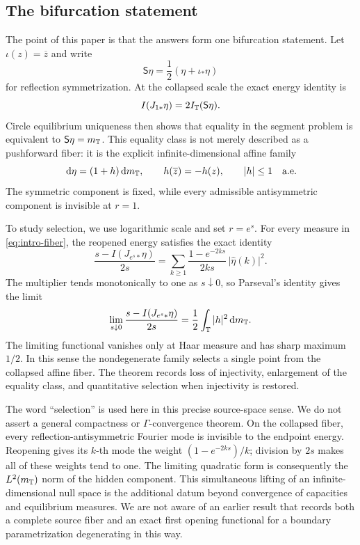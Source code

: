 \subsection*{The bifurcation statement}

The point of this paper is that the answers form one bifurcation
statement.  Let \(\iota(z)=\overline z\) and write
\[
 \mathsf S\eta=\frac12(\eta+\iota_\ast\eta)
\]
for reflection symmetrization.  At the collapsed scale the exact energy
identity is
\[
 I(J_{1\ast}\eta)=2I_{\mathbb{T}}(\mathsf S\eta).
\]
Circle equilibrium uniqueness then shows that equality in the segment
problem is equivalent to \(\mathsf S\eta=m_{\mathbb{T}}\).  This equality
class is not merely described as a pushforward fiber: it is the explicit
infinite-dimensional affine family
\begin{equation}\label{eq:intro-fiber}
 \,\mathrm{d}\eta=(1+h)\,\mathrm{d} m_{\mathbb{T}},\qquad
 h(\overline z)=-h(z),\qquad |h|\leq1\quad\text{a.e.}
\end{equation}
The symmetric component is fixed, while every admissible
antisymmetric component is invisible at \(r=1\).

To study selection, we use logarithmic scale and set \(r=e^s\).  For
every measure in \eqref{eq:intro-fiber}, the reopened energy satisfies
the exact identity
\begin{equation}\label{eq:intro-selection-exact}
 \frac{s-I(J_{e^s\ast}\eta)}{2s}
 =\sum_{k\geq1}
 \frac{1-e^{-2ks}}{2ks}\,|\widehat\eta(k)|^2.
\end{equation}
The multiplier tends monotonically to one as \(s\downarrow0\), so
Parseval's identity gives the limit
\begin{equation}\label{eq:intro-selection-limit}
 \lim_{s\downarrow0}
 \frac{s-I(J_{e^s\ast}\eta)}{2s}
 =\frac12\int_{\mathbb{T}}|h|^2\,\mathrm{d} m_{\mathbb{T}}.
\end{equation}
The limiting functional vanishes only at Haar measure and has sharp
maximum \(1/2\).  In this sense the nondegenerate family selects a
single point from the collapsed affine fiber.  The theorem records loss
of injectivity, enlargement of the equality class, and quantitative
selection when injectivity is restored.

The word ``selection'' is used here in this precise source-space
sense.  We do not assert a general compactness or
\(\Gamma\)-convergence theorem.  On the collapsed fiber, every
reflection-antisymmetric Fourier mode is invisible to the endpoint
energy.  Reopening gives its \(k\)-th mode the weight
\((1-e^{-2ks})/k\); division by \(2s\) makes all of these weights tend
to one.  The limiting quadratic form is consequently the
\(L^2(m_{\mathbb{T}})\) norm of the hidden component.  This simultaneous
lifting of an infinite-dimensional null space is the additional datum
beyond convergence of capacities and equilibrium measures.  We are
not aware of an earlier result that records both a complete source
fiber and an exact first opening functional for a boundary
parametrization degenerating in this way.

